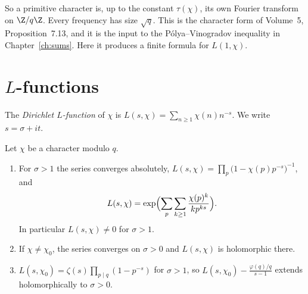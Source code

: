So a primitive character is, up to the constant $\tau(\chi)$, its own Fourier transform on $\Z/q\Z$. Every frequency has size $\sqrt q$. This is the character form of Volume~5, Proposition~7.13, and it is the input to the P\'olya--Vinogradov inequality in Chapter~\ref{ch:sums}. Here it produces a finite formula for $L(1,\chi)$.

\section{\texorpdfstring{$L$}{L}-functions}

The \emph{Dirichlet $L$-function} of $\chi$ is $L(s,\chi)=\sum_{n\ge1}\chi(n)n^{-s}$. We write $s=\sigma+it$.

\begin{theorem}\label{thm:lbasic}
Let $\chi$ be a character modulo $q$.
\begin{enumerate}[label=(\alph*)]
\item For $\sigma>1$ the series converges absolutely, $L(s,\chi)=\prod_p\bigl(1-\chi(p)p^{-s}\bigr)^{-1}$, and
\[
L(s,\chi)=\exp\Bigl(\sum_p\sum_{k\ge1}\frac{\chi(p)^k}{kp^{ks}}\Bigr).
\]
In particular $L(s,\chi)\ne0$ for $\sigma>1$.
\item If $\chi\ne\chi_0$, the series converges on $\sigma>0$ and $L(s,\chi)$ is holomorphic there.
\item $L(s,\chi_0)=\zeta(s)\prod_{p\mid q}(1-p^{-s})$ for $\sigma>1$, so $L(s,\chi_0)-\frac{\varphi(q)/q}{s-1}$ extends holomorphically to $\sigma>0$.
\end{enumerate}
\end{theorem}
